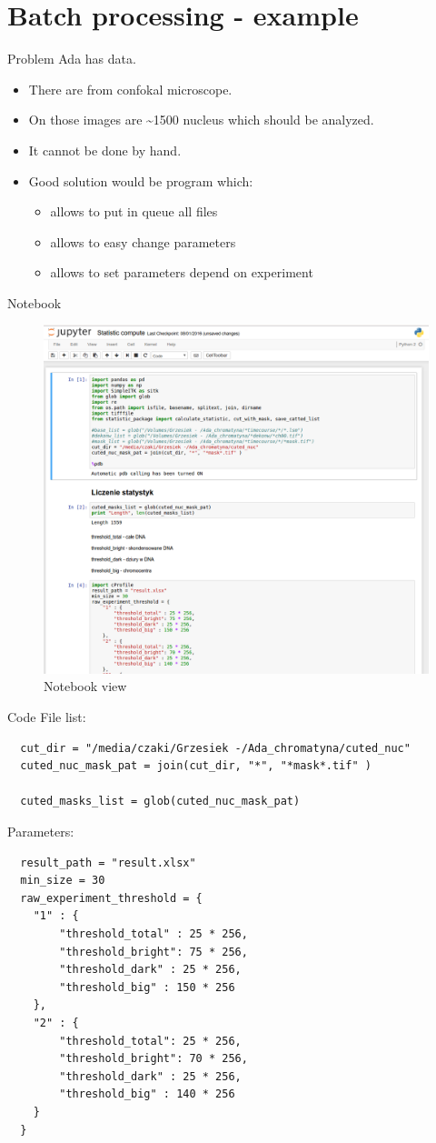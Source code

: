 \documentclass[10pt,usenames,dvipsnames]{beamer}
\begin{document}
\section{Batch processing - example}
\begin{frame}[c]{Problem}
  Ada has data. 
  \begin{itemize}
    \item There are from confokal microscope. 
    \item On those images are \textasciitilde 1500 nucleus which should be analyzed.
    \item<2-> It cannot be done by hand.
    \item<3-> Good solution would be program which:
      \begin{itemize}
        \item allows to put in queue all files
        \item allows to easy change parameters
        \item allows to set parameters depend on experiment
      \end{itemize}
  \end{itemize}
\end{frame}
\begin{frame}[c]{Notebook}
  \begin{figure}
  \includegraphics[width=0.75\linewidth]{notebook}
  \caption{Notebook view}
\end{figure}
\end{frame}
\begin{frame}[fragile,c]{Code}
  File list:
  \begin{lstlisting}
  cut_dir = "/media/czaki/Grzesiek -/Ada_chromatyna/cuted_nuc"
  cuted_nuc_mask_pat = join(cut_dir, "*", "*mask*.tif" )
    
  cuted_masks_list = glob(cuted_nuc_mask_pat)
  \end{lstlisting}
  Parameters:
  \begin{lstlisting}
  result_path = "result.xlsx"
  min_size = 30  
  raw_experiment_threshold = {
    "1" : {
        "threshold_total" : 25 * 256,
        "threshold_bright": 75 * 256,
        "threshold_dark" : 25 * 256,
        "threshold_big" : 150 * 256
    },
    "2" : {
        "threshold_total": 25 * 256,
        "threshold_bright": 70 * 256,
        "threshold_dark" : 25 * 256,
        "threshold_big" : 140 * 256
    }
  }
  \end{lstlisting}
\end{frame}
\end{document}
